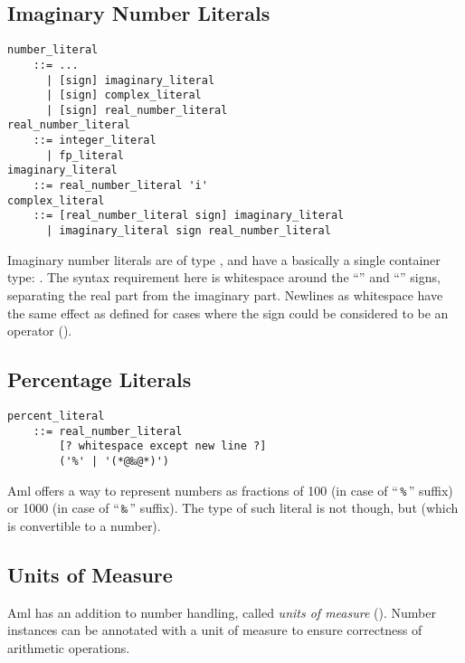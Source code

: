 \subsection{Imaginary Number Literals}
\label{sec:imaginaryliterals}

\syntax\begin{lstlisting}
number_literal
    ::= ...
      | [sign] imaginary_literal
      | [sign] complex_literal
      | [sign] real_number_literal
real_number_literal
    ::= integer_literal 
      | fp_literal
imaginary_literal 
    ::= real_number_literal 'i'
complex_literal
    ::= [real_number_literal sign] imaginary_literal
	  | imaginary_literal sign real_number_literal
\end{lstlisting}

Imaginary number literals are of type , and have a basically a single container type: . The syntax requirement here is whitespace around the ``\code{+}'' and ``\code{-}'' signs, separating the real part from the imaginary part. Newlines as whitespace have the same effect as defined for cases where the sign could be considered to be an operator ().





\subsection{Percentage Literals}
\label{sec:percentageliterals}

\syntax\begin{lstlisting}[deletekeywords={new}]
percent_literal 
    ::= real_number_literal 
        [? whitespace except new line ?] 
        ('%' | '(*@‰@*)')
\end{lstlisting}

Aml offers a way to represent numbers as fractions of 100 (in case of ``\,\lstinline!%!\,'' suffix) or 1000 (in case of ``\,\texttt{‰}\,'' suffix). The type of such literal is not  though, but  (which is convertible to a number). 





\subsection{Units of Measure}
\label{sec:unitsofmeasuresyntax}

Aml has an addition to number handling, called {\em units of measure} (). Number instances can be annotated with a unit of measure to ensure correctness of arithmetic operations. 

